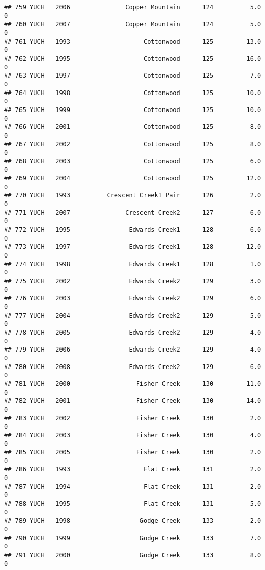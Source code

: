 \documentclass[
]{article}
\begin{document}
\begin{verbatim}
## 759 YUCH   2006               Copper Mountain      124          5.0       0
## 760 YUCH   2007               Copper Mountain      124          5.0       0
## 761 YUCH   1993                    Cottonwood      125         13.0       0
## 762 YUCH   1995                    Cottonwood      125         16.0       0
## 763 YUCH   1997                    Cottonwood      125          7.0       0
## 764 YUCH   1998                    Cottonwood      125         10.0       0
## 765 YUCH   1999                    Cottonwood      125         10.0       0
## 766 YUCH   2001                    Cottonwood      125          8.0       0
## 767 YUCH   2002                    Cottonwood      125          8.0       0
## 768 YUCH   2003                    Cottonwood      125          6.0       0
## 769 YUCH   2004                    Cottonwood      125         12.0       0
## 770 YUCH   1993          Crescent Creek1 Pair      126          2.0       0
## 771 YUCH   2007               Crescent Creek2      127          6.0       0
## 772 YUCH   1995                Edwards Creek1      128          6.0       0
## 773 YUCH   1997                Edwards Creek1      128         12.0       0
## 774 YUCH   1998                Edwards Creek1      128          1.0       0
## 775 YUCH   2002                Edwards Creek2      129          3.0       0
## 776 YUCH   2003                Edwards Creek2      129          6.0       0
## 777 YUCH   2004                Edwards Creek2      129          5.0       0
## 778 YUCH   2005                Edwards Creek2      129          4.0       0
## 779 YUCH   2006                Edwards Creek2      129          4.0       0
## 780 YUCH   2008                Edwards Creek2      129          6.0       0
## 781 YUCH   2000                  Fisher Creek      130         11.0       0
## 782 YUCH   2001                  Fisher Creek      130         14.0       0
## 783 YUCH   2002                  Fisher Creek      130          2.0       0
## 784 YUCH   2003                  Fisher Creek      130          4.0       0
## 785 YUCH   2005                  Fisher Creek      130          2.0       0
## 786 YUCH   1993                    Flat Creek      131          2.0       0
## 787 YUCH   1994                    Flat Creek      131          2.0       0
## 788 YUCH   1995                    Flat Creek      131          5.0       0
## 789 YUCH   1998                   Godge Creek      133          2.0       0
## 790 YUCH   1999                   Godge Creek      133          7.0       0
## 791 YUCH   2000                   Godge Creek      133          8.0       0

\end{verbatim}
\end{document}
